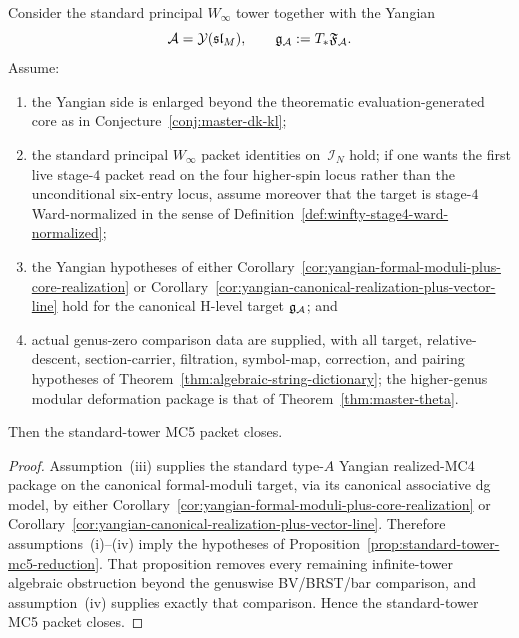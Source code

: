 \begin{corollary}
\label{cor:standard-tower-mc5-closure}
Consider the standard principal
\texorpdfstring{$W_\infty$}{W_infty} tower together with the Yangian
\[
\mathcal{A}=\mathcal{Y}(\mathfrak{sl}_M),
\qquad
\mathfrak{g}_{\mathcal{A}}:=T_*\mathfrak{F}_{\mathcal{A}}.
\]
Assume:
\begin{enumerate}[label=\textup{(\roman*)}]
\item the Yangian side is enlarged beyond the theorematic
  evaluation-generated core as in
  Conjecture~\ref{conj:master-dk-kl};
\item the standard principal \texorpdfstring{$W_\infty$}{W_infty}
  packet identities on~$\mathcal{I}_N$ hold; if one wants the first
  live stage-$4$ packet read on the four higher-spin locus rather than
  the unconditional six-entry locus, assume moreover that the target is
  stage-$4$ Ward-normalized in the sense of
  Definition~\ref{def:winfty-stage4-ward-normalized};
\item the Yangian hypotheses of
  either Corollary~\ref{cor:yangian-formal-moduli-plus-core-realization}
  or Corollary~\ref{cor:yangian-canonical-realization-plus-vector-line}
  hold for the canonical H-level target $\mathfrak{g}_{\mathcal{A}}$; and
\item actual genus-zero comparison data are supplied, with all target, relative-descent, section-carrier, filtration, symbol-map, correction, and pairing hypotheses of Theorem~\ref{thm:algebraic-string-dictionary};
  the higher-genus modular deformation package is that of Theorem~\ref{thm:master-theta}.
\end{enumerate}
Then the standard-tower MC5 packet closes.
\end{corollary}

\begin{proof}
Assumption~\textup{(iii)} supplies the standard type-$A$ Yangian
realized-MC4 package on the canonical formal-moduli target, via its
canonical associative dg model, by either
Corollary~\ref{cor:yangian-formal-moduli-plus-core-realization} or
Corollary~\ref{cor:yangian-canonical-realization-plus-vector-line}.
Therefore assumptions~\textup{(i)}--\textup{(iv)} imply the hypotheses
of Proposition~\ref{prop:standard-tower-mc5-reduction}.  That
proposition removes every remaining infinite-tower algebraic
obstruction beyond the genuswise BV/BRST/bar comparison, and
assumption~\textup{(iv)} supplies exactly that comparison.  Hence the
standard-tower MC5 packet closes.
\end{proof}

